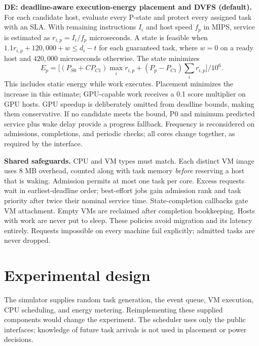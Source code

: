 \documentclass[10pt,letterpaper]{article}
\begin{document}
\textbf{DE: deadline-aware execution-energy placement and DVFS (default).} For
each candidate host, evaluate every P-state and protect every assigned task with
an SLA. With remaining instructions $I_i$ and host speed $f_p$ in MIPS, service
is estimated as $r_{i,p}=I_i/f_p$ microseconds. A state is feasible when
$1.1r_{i,p}+120{,}000+w\le d_i-t$ for each guaranteed task, where $w=0$ on a ready
host and $420{,}000$ microseconds otherwise. The state minimizes
\[
 E_p=\big[(P_{S0}+C P_{C1})\max_i r_{i,p}
             +(P_p-P_{C1})\sum_i r_{i,p}\big]/10^6.
\]
This includes static energy while work executes. Placement minimizes the increase
in this estimate; GPU-capable work receives a 0.1 score multiplier on GPU hosts.
GPU speedup is deliberately omitted from deadline bounds, making them conservative.
If no candidate meets the bound, P0 and minimum predicted service plus wake delay
provide a progress fallback. Frequency is reconsidered on admissions, completions,
and periodic checks; all cores change together, as required by the interface.

\textbf{Shared safeguards.} CPU and VM types must match. Each distinct VM image
uses 8 MB overhead, counted along with task memory \emph{before} reserving a host
that is waking. Admission permits at most one task per core. Excess requests wait
in earliest-deadline order; best-effort jobs gain admission rank and task priority
after twice their nominal service time. State-completion callbacks gate VM
attachment. Empty VMs are reclaimed after completion bookkeeping. Hosts with work
are never put to sleep. These policies avoid migration and its latency entirely.
Requests impossible on every machine fail explicitly; admitted tasks are never dropped.

\newpage
\section*{Experimental design}
The simulator supplies random task generation, the event queue, VM execution, CPU
scheduling, and energy metering. Reimplementing these supplied components would
change the experiment. The scheduler uses only the public interfaces; knowledge
of future task arrivals is not used in placement or power decisions.
\end{document}
